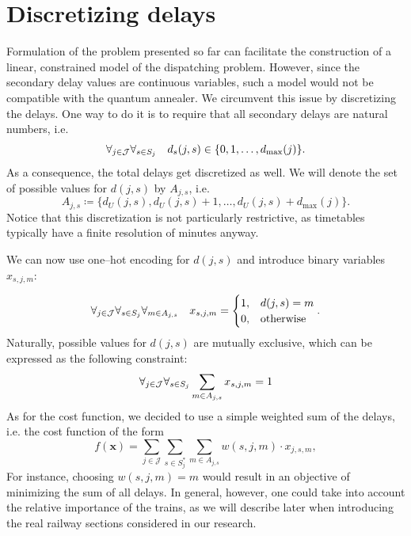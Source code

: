 \section{Discretizing delays}
Formulation of the problem presented so far can facilitate the construction of
a linear, constrained model of the dispatching problem. However, since the
secondary delay values are continuous variables, such a model would not be
compatible with the quantum annealer. We circumvent this issue by discretizing
the delays. One way to do it is to require that all secondary delays are natural
numbers, i.e.
\begin{equation}
  \forall_{j \in \mathcal{J}} \forall_{s \in S_{j}}\quad  d_{s}(j, s) \in \{0, 1, \ldots, d_{\max}(j)\}.
\end{equation}
As a consequence, the total delays get discretized as well. We will denote the
set of possible values for $d(j, s)$ by $A_{j, s}$, i.e.
\begin{equation}
  A_{j, s} \coloneq \{d_{U}(j, s), d_{U}(j, s) + 1, \ldots, d_{U}(j, s) + d_{\max}(j)\}.
\end{equation}
Notice that this discretization is not particularly restrictive, as timetables
typically have a finite resolution of minutes anyway.

We can now use one--hot encoding for $d(j, s)$ and introduce binary variables
$x_{s, j, m}$:

\begin{equation}
  \label{eq:onehotconstraint}
  \forall_{j \in \mathcal{J}}\forall_{s \in S_{j}} \forall_{m \in A_{j, s}} \quad x_{s,j,m} = \begin{cases}
    1, & d(j, s) = m      \\
    0, & \mbox{otherwise}
  \end{cases}.
\end{equation}
Naturally, possible values for $d(j, s)$ are mutually exclusive, which can be expressed as
the following constraint:
\begin{equation}
  \forall_{j \in \mathcal{J}}\forall_{s \in S_{j}} \sum_{m \in A_{j, s}} x_{s, j, m} = 1
\end{equation}
As for the cost function, we decided to use a simple weighted sum of the delays, i.e. the
cost function of the form
\begin{equation}
  \label{eq:qubo:cost}
  f(\mathbf{x}) = \sum_{j \in \mathcal{J}}\sum_{s \in S^{*}_{j}}\sum_{m \in A_{j,s}} w(s,j,m) \cdot x_{j,s,m},
\end{equation}
For instance, choosing $w(s, j, m)=m$ would result in an objective of minimizing the sum of all
delays. In general, however, one could take into account the relative importance of the
trains, as we will describe later when introducing the real railway sections considered in our research.

